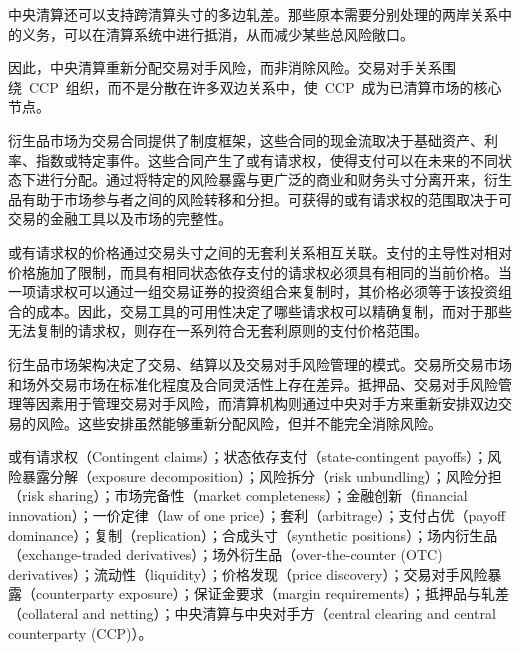 中央清算还可以支持跨清算头寸的多边轧差。那些原本需要分别处理的两岸关系中的义务，可以在清算系统中进行抵消，从而减少某些总风险敞口。

因此，中央清算重新分配交易对手风险，而非消除风险。交易对手关系围绕~CCP~组织，而不是分散在许多双边关系中，使~CCP~成为已清算市场的核心节点。



衍生品市场为交易合同提供了制度框架，这些合同的现金流取决于基础资产、利率、指数或特定事件。这些合同产生了或有请求权，使得支付可以在未来的不同状态下进行分配。通过将特定的风险暴露与更广泛的商业和财务头寸分离开来，衍生品有助于市场参与者之间的风险转移和分担。可获得的或有请求权的范围取决于可交易的金融工具以及市场的完整性。

或有请求权的价格通过交易头寸之间的无套利关系相互关联。支付的主导性对相对价格施加了限制，而具有相同状态依存支付的请求权必须具有相同的当前价格。当一项请求权可以通过一组交易证券的投资组合来复制时，其价格必须等于该投资组合的成本。因此，交易工具的可用性决定了哪些请求权可以精确复制，而对于那些无法复制的请求权，则存在一系列符合无套利原则的支付价格范围。

衍生品市场架构决定了交易、结算以及交易对手风险管理的模式。交易所交易市场和场外交易市场在标准化程度及合同灵活性上存在差异。抵押品、交易对手风险管理等因素用于管理交易对手风险，而清算机构则通过中央对手方来重新安排双边交易的风险。这些安排虽然能够重新分配风险，但并不能完全消除风险。


或有请求权（Contingent claims）；状态依存支付（state-contingent payoffs）；风险暴露分解（exposure decomposition）；风险拆分（risk unbundling）；风险分担（risk sharing）；市场完备性（market completeness）；金融创新（financial innovation）；一价定律（law of one price）；套利（arbitrage）；支付占优（payoff dominance）；复制（replication）；合成头寸（synthetic positions）；场内衍生品（exchange-traded derivatives）；场外衍生品（over-the-counter (OTC) derivatives）；流动性（liquidity）；价格发现（price discovery）；交易对手风险暴露（counterparty exposure）；保证金要求（margin requirements）；抵押品与轧差（collateral and netting）；中央清算与中央对手方（central clearing and central counterparty (CCP)）。

